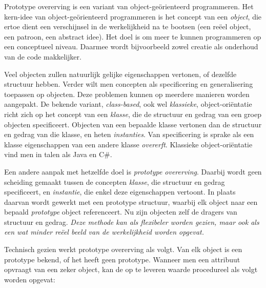 \begin{KelleyWouldAdd}
Prototype overerving is een variant van object-geörienteerd programmeren. Het kern-idee van object-geörienteerd programmeren is het concept van een \emph{object}, die ertoe dient een verschijnsel in de werkelijkheid na te bootsen (een reëel object, een patroon, een abstract idee). Het doel is om meer te kunnen programmeren op een conceptueel niveau. Daarmee wordt bijvoorbeeld zowel creatie als onderhoud van de code makkelijker.
\end{KelleyWouldAdd}

\begin{KelleyWouldAdd}
Veel objecten zullen natuurlijk gelijke eigenschappen vertonen, of dezelfde structuur hebben. Verder wilt men concepten als specificering en generalisering toepassen op objecten. Deze problemen kunnen op meerdere manieren worden aangepakt. De bekende variant, \emph{class-based}, ook wel \emph{klassieke}, object-oriëntatie richt zich op het concept van een \emph{klasse}, die de structuur en gedrag van een groep objecten specificeert. Objecten van een bepaalde klasse vertonen dan de structuur en gedrag van die klasse, en heten \emph{instanties}. Van specificering is sprake als een klasse eigenschappen van een andere klasse \emph{overerft}. Klassieke object-oriëntatie vind men in talen als Java en C\#.
\end{KelleyWouldAdd}

\begin{KelleyWouldAdd}
Een andere aanpak met hetzelfde doel is \emph{prototype overerving}. Daarbij wordt geen scheiding gemaakt tussen de concepten \emph{klasse}, die structuur en gedrag specificeert, en \emph{instantie}, die enkel deze eigenschappen vertoont. In plaats daarvan wordt gewerkt met een prototype structuur, waarbij elk object naar een bepaald \emph{prototype} object referenceert. Nu zijn objecten zelf de dragers van structuur en gedrag. \textit{Deze methode kan als flexibeler worden gezien, maar ook als een wat minder reëel beeld van de werkelijkheid worden opgevat.}
\end{KelleyWouldAdd}

\begin{KelleyWouldAdd}
Technisch gezien werkt prototype overerving als volgt. Van elk object is een prototype bekend, of het heeft geen prototype. Wanneer men een attribuut opvraagt van een zeker object, kan de op te leveren waarde procedureel als volgt worden opgevat:
\end{KelleyWouldAdd}

